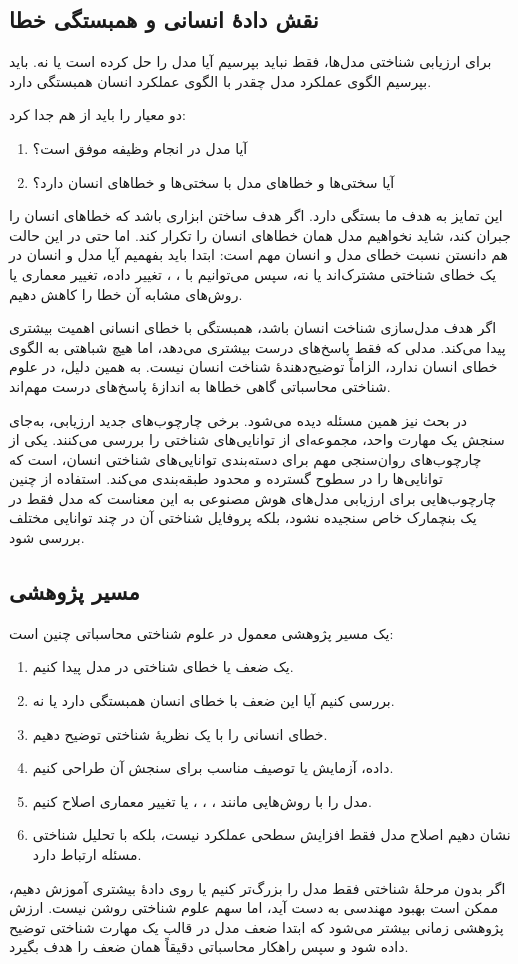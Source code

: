 \subsection{نقش دادهٔ انسانی و همبستگی خطا}
برای ارزیابی شناختی مدل‌ها، فقط نباید بپرسیم آیا مدل  را حل کرده است یا نه. باید بپرسیم الگوی عملکرد مدل چقدر با الگوی عملکرد انسان همبستگی دارد.

دو معیار را باید از هم جدا کرد:
\begin{enumerate}
  \item آیا مدل در انجام وظیفه موفق است؟
  \item آیا سختی‌ها و خطاهای مدل با سختی‌ها و خطاهای انسان  دارد؟
\end{enumerate}

این تمایز به هدف ما بستگی دارد. اگر هدف ساختن ابزاری باشد که خطاهای انسان را جبران کند، شاید نخواهیم مدل همان خطاهای انسان را تکرار کند. اما حتی در این حالت هم دانستن نسبت خطای مدل و انسان مهم است: ابتدا باید بفهمیم آیا مدل و انسان در یک خطای شناختی مشترک‌اند یا نه، سپس می‌توانیم با ، ، تغییر داده، تغییر معماری یا روش‌های مشابه آن خطا را کاهش دهیم.

اگر هدف مدل‌سازی شناخت انسان باشد، همبستگی با خطای انسانی اهمیت بیشتری پیدا می‌کند. مدلی که فقط پاسخ‌های درست بیشتری می‌دهد، اما هیچ شباهتی به الگوی خطای انسان ندارد، الزاماً توضیح‌دهندهٔ شناخت انسان نیست. به همین دلیل، در علوم شناختی محاسباتی گاهی خطاها به اندازهٔ پاسخ‌های درست مهم‌اند.

در بحث  نیز همین مسئله دیده می‌شود. برخی چارچوب‌های جدید ارزیابی، به‌جای سنجش یک مهارت واحد، مجموعه‌ای از توانایی‌های شناختی را بررسی می‌کنند. یکی از چارچوب‌های روان‌سنجی مهم برای دسته‌بندی توانایی‌های شناختی انسان،  است که توانایی‌ها را در سطوح گسترده و محدود طبقه‌بندی می‌کند. استفاده از چنین چارچوب‌هایی برای ارزیابی مدل‌های هوش مصنوعی به این معناست که مدل فقط در یک بنچمارک خاص سنجیده نشود، بلکه پروفایل شناختی آن در چند توانایی مختلف بررسی شود.

\subsection{مسیر پژوهشی}
یک مسیر پژوهشی معمول در علوم شناختی محاسباتی چنین است:
\begin{enumerate}
  \item یک ضعف یا خطای شناختی در مدل پیدا کنیم.
  \item بررسی کنیم آیا این ضعف با خطای انسان همبستگی دارد یا نه.
  \item خطای انسانی را با یک نظریهٔ شناختی توضیح دهیم.
  \item داده، آزمایش یا توصیف مناسب برای سنجش آن طراحی کنیم.
  \item مدل را با روش‌هایی مانند ، ، ،  یا تغییر معماری اصلاح کنیم.
  \item نشان دهیم اصلاح مدل فقط افزایش سطحی عملکرد نیست، بلکه با تحلیل شناختی مسئله ارتباط دارد.
\end{enumerate}

اگر بدون مرحلهٔ شناختی فقط مدل را بزرگ‌تر کنیم یا روی دادهٔ بیشتری آموزش دهیم، ممکن است بهبود مهندسی به دست آید، اما سهم علوم شناختی روشن نیست. ارزش پژوهشی زمانی بیشتر می‌شود که ابتدا ضعف مدل در قالب یک مهارت شناختی توضیح داده شود و سپس راهکار محاسباتی دقیقاً همان ضعف را هدف بگیرد.
